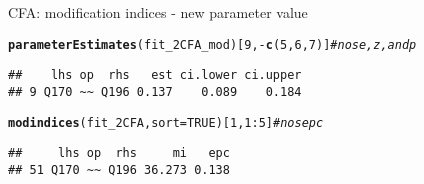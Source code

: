\documentclass[10pt]{beamer}\usepackage[]{graphicx}\usepackage[]{xcolor}
\makeatletter
\newcommand{\hlnum}[1]{\textcolor[rgb]{0.686,0.059,0.569}{#1}}%
\newcommand{\hlcom}[1]{\textcolor[rgb]{0.678,0.584,0.686}{\textit{#1}}}%
\newcommand{\hlopt}[1]{\textcolor[rgb]{0,0,0}{#1}}%
\newcommand{\hldef}[1]{\textcolor[rgb]{0.345,0.345,0.345}{#1}}%
\newcommand{\hlkwc}[1]{\textcolor[rgb]{0.333,0.667,0.333}{#1}}%
\newcommand{\hlkwd}[1]{\textcolor[rgb]{0.737,0.353,0.396}{\textbf{#1}}}%
\newenvironment{kframe}{%
 \def\at@end@of@kframe{}%
 \ifinner\ifhmode%
  \def\at@end@of@kframe{\end{minipage}}%
  \begin{minipage}{\columnwidth}%
 \fi\fi%
 \def\FrameCommand##1{\hskip\@totalleftmargin \hskip-\fboxsep
 \colorbox{shadecolor}{##1}\hskip-\fboxsep
     \hskip-\linewidth \hskip-\@totalleftmargin \hskip\columnwidth}%
 \MakeFramed {\advance\hsize-\width
   \@totalleftmargin\z@ \linewidth\hsize
   \@setminipage}}%
 {\par\unskip\endMakeFramed%
 \at@end@of@kframe}
\newenvironment{knitrout}{}{} %
\makeatother
\begin{document}
\begin{frame}[fragile]{CFA: modification indices - new parameter value}

\begin{knitrout}
\color{fgcolor}\begin{kframe}
\begin{alltt}
\hlkwd{parameterEstimates}\hldef{(fit_2CFA_mod)[}\hlnum{9}\hldef{,}\hlopt{-}\hlkwd{c}\hldef{(}\hlnum{5}\hldef{,}\hlnum{6}\hldef{,}\hlnum{7}\hldef{)]} \hlcom{# no se, z, and p}
\end{alltt}
\begin{verbatim}
##    lhs op  rhs   est ci.lower ci.upper
## 9 Q170 ~~ Q196 0.137    0.089    0.184
\end{verbatim}
\end{kframe}
\end{knitrout}

\begin{knitrout}
\color{fgcolor}\begin{kframe}
\begin{alltt}
\hlkwd{modindices}\hldef{(fit_2CFA,} \hlkwc{sort} \hldef{=} \hlnum{TRUE}\hldef{)[}\hlnum{1}\hldef{,}\hlnum{1}\hlopt{:}\hlnum{5}\hldef{]} \hlcom{# no sepc }
\end{alltt}
\begin{verbatim}
##     lhs op  rhs     mi   epc
## 51 Q170 ~~ Q196 36.273 0.138
\end{verbatim}
\end{kframe}
\end{knitrout}

\end{frame}
%
\end{document}

